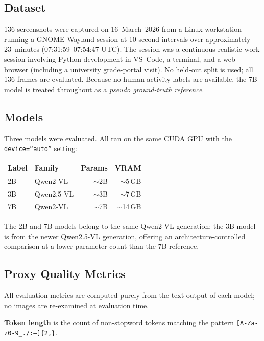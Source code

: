 \documentclass[10pt, twocolumn]{article}
\begin{document}
\subsection{Dataset}

136 screenshots were captured on 16~March~2026 from a Linux workstation running a
GNOME Wayland session at 10-second intervals over approximately 23~minutes
(07:31:59--07:54:47 UTC). The session was a continuous realistic work session
involving Python development in VS~Code, a terminal, and a web browser (including
a university grade-portal visit). No held-out split is used; all 136 frames are
evaluated. Because no human activity labels are available, the 7B model is treated
throughout as a \emph{pseudo ground-truth reference}.

\subsection{Models}

Three models were evaluated. All ran on the same CUDA GPU with the
\texttt{device=``auto''} setting:

\begin{center}
\small
\begin{tabular}{@{}llrr@{}}
\toprule
\textbf{Label} & \textbf{Family} & \textbf{Params} & \textbf{VRAM} \\
\midrule
2B & Qwen2-VL    & $\sim$2B & $\sim$5\,GB \\
3B & Qwen2.5-VL  & $\sim$3B & $\sim$7\,GB \\
7B & Qwen2-VL    & $\sim$7B & $\sim$14\,GB \\
\bottomrule
\end{tabular}
\end{center}

\noindent
The 2B and 7B models belong to the same Qwen2-VL generation; the 3B model is from
the newer Qwen2.5-VL generation, offering an architecture-controlled comparison at
a lower parameter count than the 7B reference.

\subsection{Proxy Quality Metrics}

All evaluation metrics are computed purely from the text output of each model; no
images are re-examined at evaluation time.

\textbf{Token length} is the count of non-stopword tokens matching the pattern
\texttt{[A-Za-z0-9\_./:--]\{2,\}}.
\end{document}
